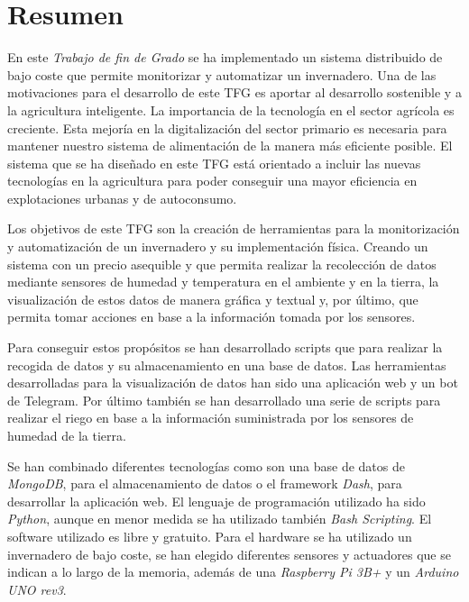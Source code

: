 \documentclass[a4paper, 12pt, oneside]{book}
\begin{document}

\chapter*{Resumen}
En este \textit{Trabajo de fin de Grado} se ha implementado un sistema distribuido de bajo coste que permite monitorizar y automatizar un invernadero. Una de las motivaciones para el desarrollo de este TFG es aportar al desarrollo sostenible y a la agricultura inteligente. La importancia de la tecnología en el sector agrícola es creciente. Esta mejoría en la digitalización del sector primario es necesaria para mantener nuestro sistema de alimentación de la manera más eficiente posible. El sistema que se ha diseñado en este TFG está orientado a incluir las nuevas tecnologías en la agricultura para poder conseguir una mayor eficiencia en explotaciones urbanas y de autoconsumo.

Los objetivos de este TFG son la creación de herramientas para la monitorización y automatización de un invernadero y su implementación física. Creando un sistema con un precio asequible y que permita realizar la recolección de datos mediante sensores de humedad y temperatura en el ambiente y en la tierra, la visualización de estos datos de manera gráfica y textual y, por último, que permita tomar acciones en base a la información tomada por los sensores.

Para conseguir estos propósitos se han desarrollado scripts que para realizar la recogida de datos y su almacenamiento en una base de datos. Las herramientas desarrolladas para la visualización de datos han sido una aplicación web y un bot de Telegram. Por último también se han desarrollado una serie de scripts para realizar el riego en base a la información suministrada por los sensores de humedad de la tierra.

Se han combinado diferentes tecnologías como son una base de datos de \textit{MongoDB}, para el almacenamiento de datos o el framework \textit{Dash}, para desarrollar la aplicación web.
El lenguaje de programación utilizado ha sido \textit{Python}, aunque en menor medida se ha utilizado también \textit{Bash Scripting}. El software utilizado es libre y gratuito. Para el hardware se ha utilizado un invernadero de bajo coste, se han elegido diferentes sensores y actuadores que se indican a lo largo de la memoria, además de una \textit{Raspberry Pi 3B+} y un \textit{Arduino UNO rev3}.
\end{document}
